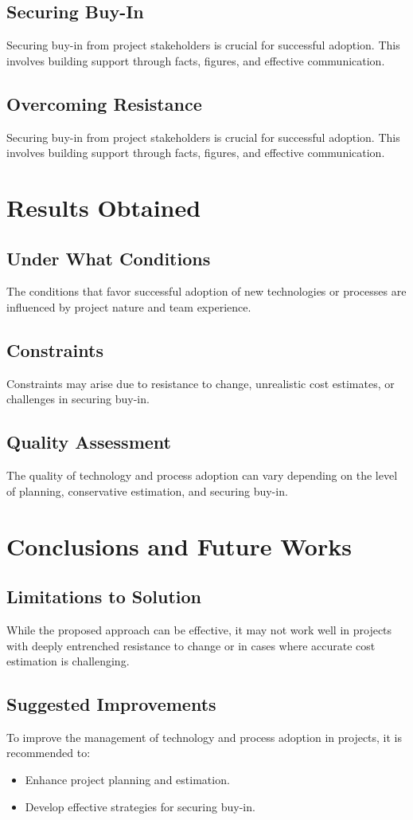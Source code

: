 \documentclass{article}
\begin{document}
\subsection{Securing Buy-In}
Securing buy-in from project stakeholders is crucial for successful adoption. This involves building support through facts, figures, and effective communication.
\subsection{Overcoming Resistance}
Securing buy-in from project stakeholders is crucial for successful adoption. This involves building support through facts, figures, and effective communication.



\section{Results Obtained}
\subsection{Under What Conditions}
The conditions that favor successful adoption of new technologies or processes are influenced by project nature and team experience.
\subsection{Constraints}
Constraints may arise due to resistance to change, unrealistic cost estimates, or challenges in securing buy-in.
\subsection{Quality Assessment}
The quality of technology and process adoption can vary depending on the level of planning, conservative estimation, and securing buy-in.

\section{Conclusions and Future Works}
\subsection{Limitations to Solution}
While the proposed approach can be effective, it may not work well in projects with deeply entrenched resistance to change or in cases where accurate cost estimation is challenging.
\subsection{Suggested Improvements}
To improve the management of technology and process adoption in projects, it is recommended to:
\begin{itemize}
  \item Enhance project planning and estimation.
  \item Develop effective strategies for securing buy-in.
\end{itemize}
\end{document}
